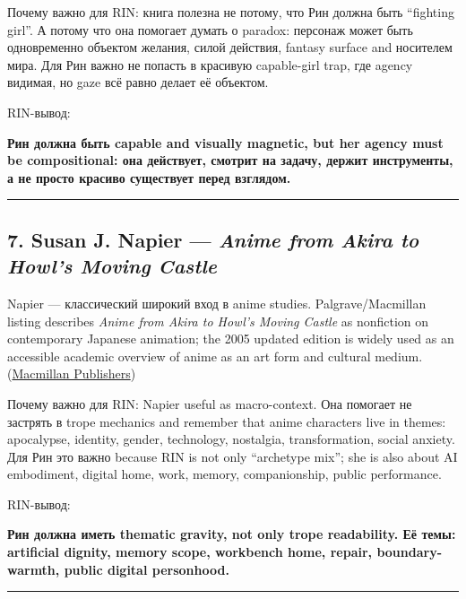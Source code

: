 Почему важно для RIN: книга полезна не потому, что Рин должна быть
``fighting girl''. А потому что она помогает думать о paradox: персонаж
может быть одновременно объектом желания, силой действия, fantasy
surface and носителем мира. Для Рин важно не попасть в красивую
capable-girl trap, где agency видимая, но gaze всё равно делает её
объектом.

RIN-вывод:

\textbf{Рин должна быть capable and visually magnetic, but her agency
must be compositional: она действует, смотрит на задачу, держит
инструменты, а не просто красиво существует перед взглядом.}

\begin{center}\rule{0.5\linewidth}{0.5pt}\end{center}

\subsection*{\texorpdfstring{7. Susan J. Napier --- \emph{Anime from
Akira to Howl's Moving
Castle}}{7. Susan J. Napier --- Anime from Akira to Howl's Moving Castle}}

Napier --- классический широкий вход в anime studies. Palgrave/\hspace{0pt}Macmillan
listing describes \emph{Anime from Akira to Howl's Moving Castle} as
nonfiction on contemporary Japanese animation; the 2005 updated edition
is widely used as an accessible academic overview of anime as an art
form and cultural medium.
(\href{https://us.macmillan.com/books/9781403970527/animefromakiratohowlsmovingcastle/?utm_source=chatgpt.com}{Macmillan
Publishers})

Почему важно для RIN: Napier useful as macro-context. Она помогает не
застрять в trope mechanics and remember that anime characters live in
themes: apocalypse, identity, gender, technology, nostalgia,
transformation, social anxiety. Для Рин это важно because RIN is not
only ``archetype mix''; she is also about AI embodiment, digital home,
work, memory, companionship, public performance.

RIN-вывод:

\textbf{Рин должна иметь thematic gravity, not only trope readability.
Её темы: artificial dignity, memory scope, workbench home, repair,
boundary-warmth, public digital personhood.}

\begin{center}\rule{0.5\linewidth}{0.5pt}\end{center}

